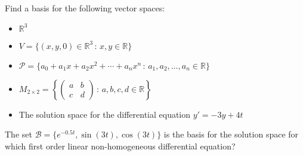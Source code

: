 \begin{problem}
    Find a basis for the following vector spaces:
    \begin{itemize}
        \item $\mathbb{R}^3$
        \item $V = \{ (x,y,0) \in \mathbb{R}^3 \, : \, x,y \in \mathbb{R} \}$
        \item $\mathcal{P} = \{a_0 + a_1 x + a_2 x^2 + \cdots + a_n x^n \, : \, a_1,
                a_2, \ldots, a_n \in \mathbb{R} \}$
        \item $M_{2\times2} = \left\{ \begin{pmatrix} a & b \\ c & d \end{pmatrix} \, : \,
            a,b,c,d \in \mathbb{R} \right\}$
        \item The solution space for the differential equation $y' = -3y + 4t$
    \end{itemize}
\end{problem}

\begin{problem}
    The set $\mathcal{B} = \{ e^{-0.5t},\sin(3t),\cos(3t)\}$ is the basis for the solution
    space for which first order linear non-homogeneous differential equation?
\end{problem}


